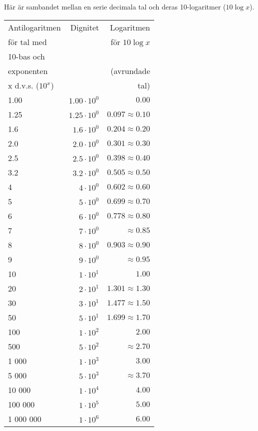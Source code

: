 Här är sambandet mellan en serie decimala tal och deras 10-logaritmer (\(10\log x\)).

\begin{tabular}{l|r|r}
Antilogaritmen    & Dignitet & Logaritmen            \\
för tal med       &          & för \(10\log x\)        \\
10-bas och        &          &                       \\
exponenten        &          & (avrundade            \\
x d.v.s. (\(10^x\)) &          & tal)                  \\ \hline
1.00      & \(1.00 \cdot 10^0\) & \(0.00\)               \\
1.25      & \(1.25 \cdot 10^0\) & \(0.097 \approx 0.10\) \\
1.6       & \(1.6 \cdot 10^0\) & \(0.204 \approx 0.20\)  \\
2.0       & \(2.0 \cdot 10^0\) & \(0.301 \approx 0.30\)  \\
2.5       & \(2.5 \cdot 10^0\) & \(0.398 \approx 0.40\)  \\
3.2       & \(3.2 \cdot 10^0\) & \(0.505 \approx 0.50\)  \\
4         & \(4 \cdot 10^0\)   & \(0.602 \approx 0.60\)  \\
5         & \(5 \cdot 10^0\)   & \(0.699 \approx 0.70\)  \\
6         & \(6 \cdot 10^0\)   & \(0.778 \approx 0.80\)  \\
7         & \(7 \cdot 10^0\)   & \(\approx 0.85\)        \\
8         & \(8 \cdot 10^0\)   & \(0.903 \approx 0.90\)  \\
9         & \(9 \cdot 10^0\)   & \(\approx 0.95\)        \\
10        & \(1 \cdot 10^1\)   & \(1.00\)                \\
20        & \(2 \cdot 10^1\)   & \(1.301 \approx 1.30\)  \\
30        & \(3 \cdot 10^1\)   & \(1.477 \approx 1.50\)  \\
50        & \(5 \cdot 10^1\)   & \(1.699 \approx 1.70\)  \\
100       & \(1 \cdot 10^2\)   & \(2.00\)                \\
500       & \(5 \cdot 10^2\)   & \(\approx 2.70\)        \\
1 000     & \(1 \cdot 10^3\)   & \(3.00\)                \\
5 000     & \(5 \cdot 10^3\)   & \(\approx3.70\)         \\
10 000    & \(1 \cdot 10^4\)   & \(4.00\)                \\
100 000   & \(1 \cdot 10^5\)   & \(5.00\)                \\
1 000 000 & \(1 \cdot 10^6\)   & \(6.00\)                \\
\end{tabular}

